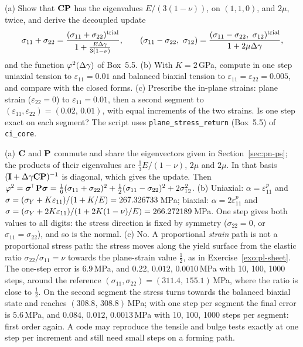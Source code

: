 \label{exo:pn-ps}
%
(a) Show that $\mathbf{C}\mathbf{P}$ has the eigenvalues $E/(3(1-\nu))$, on
$(1,1,0)$, and $2\mu$, twice, and derive the decoupled update
\[
  \sigma_{11}+\sigma_{22}=\frac{(\sigma_{11}+\sigma_{22})^\trial}{1+\frac{E\dg}{3(1-\nu)}},\qquad
  (\sigma_{11}-\sigma_{22},\ \sigma_{12})=\frac{(\sigma_{11}-\sigma_{22},\ \sigma_{12})^\trial}{1+2\mu\dg},
\]
and the function $\varphi^2(\Delta\gamma)$ of Box~5.5. (b) With $K=2$\,GPa, compute in
one step uniaxial tension to $\varepsilon_{11}=0.01$ and balanced biaxial
tension to $\varepsilon_{11}=\varepsilon_{22}=0.005$, and compare with the
closed forms. (c) Prescribe the in-plane strains: plane strain
($\varepsilon_{22}=0$) to $\varepsilon_{11}=0.01$, then a second segment to
$(\varepsilon_{11},\varepsilon_{22})=(0.02,\,0.01)$, with equal increments of
the two strains. Is one step exact on each segment? The
script uses \texttt{plane\_stress\_return} (Box~5.5) of \texttt{ci\_core}.
\begin{solution}
(a) $\mathbf{C}$ and $\mathbf{P}$ commute and share the eigenvectors given in
Section~\ref{sec:pn-ps}; the products of their eigenvalues are
$\tfrac13E/(1-\nu)$, $2\mu$ and $2\mu$. In that basis
$(\mathbf{I}+\Delta\gamma\mathbf{C}\mathbf{P})^{-1}$ is diagonal, which gives the update. Then
$\varphi^2=\bm{\sigma}^{\!\top}\mathbf{P}\bm{\sigma}=\tfrac16(\sigma_{11}+\sigma_{22})^2+\tfrac12(\sigma_{11}-\sigma_{22})^2+2\sigma_{12}^2$.
(b) Uniaxial: $\alpha=\varepsilon^p_{11}$ and $\sigma=(\sigma_{Y}+K\varepsilon_{11})/(1+K/E)=267.326733$\,MPa;
biaxial: $\alpha=2\varepsilon^p_{11}$ and
$\sigma=(\sigma_{Y}+2K\varepsilon_{11})/(1+2K(1-\nu)/E)=266.272189$\,MPa. One step
gives both values to all digits: the stress direction is fixed by symmetry
($\sigma_{22}=0$, or $\sigma_{11}=\sigma_{22}$), and so is the normal.
(c) No. A proportional \emph{strain} path is not a proportional stress path:
the stress moves along the yield surface from the elastic ratio
$\sigma_{22}/\sigma_{11}=\nu$ towards the plane-strain value $\tfrac12$, as in
Exercise~\ref{exo:pl-sheet}. The one-step error is $6.9$\,MPa, and $0.22$,
$0.012$, $0.0010$\,MPa with 10, 100, 1000 steps, around the reference
$(\sigma_{11},\sigma_{22})=(311.4,\,155.1)$\,MPa, where the ratio is close to
$\tfrac12$. On the second segment the stress turns towards the balanced
biaxial state and reaches $(308.8,\,308.8)$\,MPa; with one step per segment the
final error is $5.6$\,MPa, and $0.084$, $0.012$, $0.0013$\,MPa with 10, 100,
1000 steps per segment: first order again. A code may reproduce the
tensile and bulge tests exactly at one step per increment and still need
small steps on a forming path.

\end{solution}

